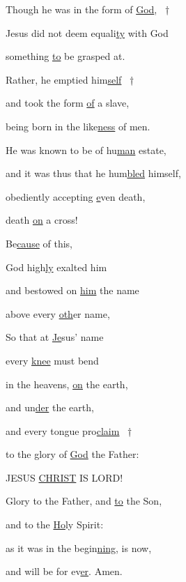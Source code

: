 \noindent Though he was in the form of \uline{God}, ~†~\nopagebreak

Jesus did not deem equali\uline{ty} with God ~\GreStar{}~\nopagebreak

something \uline{to} be grasped at.

\noindent Rather, he emptied him\uline{self} ~†~\nopagebreak

and took the form \uline{of} a slave, ~\GreStar{}~\nopagebreak

being born in the like\uline{ness} of men.

\noindent He was known to be of hu\uline{man} estate, ~\GreStar{}~\nopagebreak

and it was thus that he hum\uline{bled} himself,

\noindent obediently accepting \uline{e}ven death, ~\GreStar{}~\nopagebreak

death \uline{on} a cross!

\noindent Be\uline{cause} of this, ~\GreStar{}~\nopagebreak

God high\uline{ly} exalted him

\noindent and bestowed on \uline{him} the name ~\GreStar{}~\nopagebreak

above every \uline{oth}er name,

\noindent So that at \uline{Je}sus’ name ~\GreStar{}~\nopagebreak

every \uline{knee} must bend

\noindent in the heavens, \uline{on} the earth, ~\GreStar{}~\nopagebreak

and un\uline{der} the earth,

\noindent and every tongue pro\uline{claim} ~†~\nopagebreak

to the glory of \uline{God} the Father: ~\GreStar{}~\nopagebreak

JESUS \uline{CHRIST} IS LORD!

\noindent Glory to the Father, and \uline{to} the Son,~\GreStar{}~\nopagebreak

and to the \uline{Ho}ly Spirit:

\noindent as it was in the begin\uline{ning}, is now,~\GreStar{}~\nopagebreak

and will be for ev\uline{er}. Amen.
